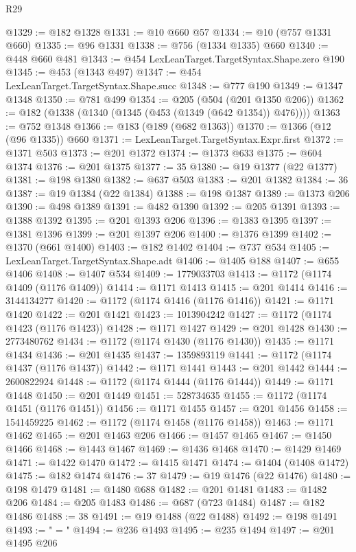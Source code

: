 \begin{lexlean}{R29}
\begin{coremodule}
@1329 := @182 @1328
@1331 := @10 @660 @57
@1334 := @10 (@757 @1331 @660)
@1335 := @96 @1331
@1338 := @756 (@1334 @1335) @660
@1340 := @448 @660 @481
@1343 := @454 LexLeanTarget.TargetSyntax.Shape.zero @190
@1345 := @453 (@1343 @497)
@1347 := @454 LexLeanTarget.TargetSyntax.Shape.succ
@1348 := @777 @190
@1349 := @1347 @1348
@1350 := @781 @499
@1354 := @205 (@504 (@201 @1350 @206))
@1362 := @182 (@1338 (@1340 (@1345 (@453 (@1349 (@642 @1354)) @476))))
@1363 := @752 @1348
@1366 := @183 (@189 (@682 @1363))
@1370 := @1366 (@12 (@96 @1335)) @660
@1371 := LexLeanTarget.TargetSyntax.Expr.first
@1372 := @1371 @503
@1373 := @201 @1372
@1374 := @1373 @633
@1375 := @604 @1374
@1376 := @201 @1375
@1377 := 35
@1380 := @19 @1377 (@22 @1377)
@1381 := @198 @1380
@1382 := @637 @503
@1383 := @201 @1382
@1384 := 36
@1387 := @19 @1384 (@22 @1384)
@1388 := @198 @1387
@1389 := @1373 @206
@1390 := @498 @1389
@1391 := @482 @1390
@1392 := @205 @1391
@1393 := @1388 @1392
@1395 := @201 @1393 @206
@1396 := @1383 @1395
@1397 := @1381 @1396
@1399 := @201 @1397 @206
@1400 := @1376 @1399
@1402 := @1370 (@661 @1400)
@1403 := @182 @1402
@1404 := @737 @534
@1405 := LexLeanTarget.TargetSyntax.Shape.adt
@1406 := @1405 @188
@1407 := @655 @1406
@1408 := @1407 @534
@1409 := 1779033703
@1413 := @1172 (@1174 @1409 (@1176 @1409))
@1414 := @1171 @1413
@1415 := @201 @1414
@1416 := 3144134277
@1420 := @1172 (@1174 @1416 (@1176 @1416))
@1421 := @1171 @1420
@1422 := @201 @1421
@1423 := 1013904242
@1427 := @1172 (@1174 @1423 (@1176 @1423))
@1428 := @1171 @1427
@1429 := @201 @1428
@1430 := 2773480762
@1434 := @1172 (@1174 @1430 (@1176 @1430))
@1435 := @1171 @1434
@1436 := @201 @1435
@1437 := 1359893119
@1441 := @1172 (@1174 @1437 (@1176 @1437))
@1442 := @1171 @1441
@1443 := @201 @1442
@1444 := 2600822924
@1448 := @1172 (@1174 @1444 (@1176 @1444))
@1449 := @1171 @1448
@1450 := @201 @1449
@1451 := 528734635
@1455 := @1172 (@1174 @1451 (@1176 @1451))
@1456 := @1171 @1455
@1457 := @201 @1456
@1458 := 1541459225
@1462 := @1172 (@1174 @1458 (@1176 @1458))
@1463 := @1171 @1462
@1465 := @201 @1463 @206
@1466 := @1457 @1465
@1467 := @1450 @1466
@1468 := @1443 @1467
@1469 := @1436 @1468
@1470 := @1429 @1469
@1471 := @1422 @1470
@1472 := @1415 @1471
@1474 := @1404 (@1408 @1472)
@1475 := @182 @1474
@1476 := 37
@1479 := @19 @1476 (@22 @1476)
@1480 := @198 @1479
@1481 := @1480 @688
@1482 := @201 @1481
@1483 := @1482 @206
@1484 := @205 @1483
@1486 := @687 (@723 @1484)
@1487 := @182 @1486
@1488 := 38
@1491 := @19 @1488 (@22 @1488)
@1492 := @198 @1491
@1493 := " = "
@1494 := @236 @1493
@1495 := @235 @1494
@1497 := @201 @1495 @206

\end{coremodule}
\end{lexlean}
